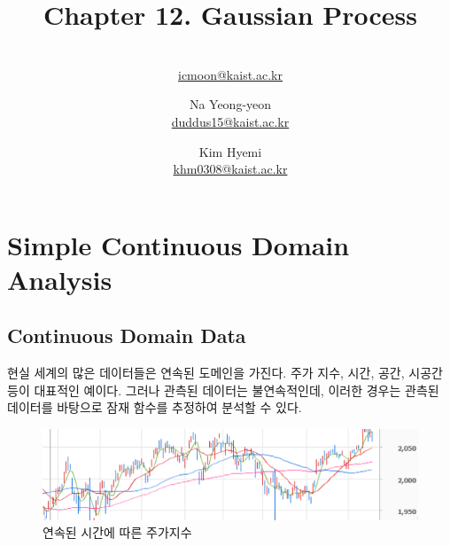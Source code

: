 \documentclass[a4paper]{oblivoir}
\title{Chapter 12. Gaussian Process}
\author{\makebox[.9\textwidth]{Moon Il-chul}\\ \href{mailto:icmoon@kaist.ac.kr}{icmoon@kaist.ac.kr}
\and Na Yeong-yeon\\ \href{mailto:duddus15@kaist.ac.kr}{duddus15@kaist.ac.kr}
\and Kim Hyemi\\ \href{mailto:khm0308@kaist.ac.kr}{khm0308@kaist.ac.kr}}
\begin{document}
\maketitle

\tableofcontents
\newpage

\section{Simple Continuous Domain Analysis}

\subsection{Continuous Domain Data}

현실 세계의 많은 데이터들은 연속된 도메인을 가진다. 주가 지수, 시간, 공간, 시공간 등이 대표적인 예이다. 그러나 관측된 데이터는 불연속적인데, 이러한 경우는 관측된 데이터를 바탕으로 잠재 함수를 추정하여 분석할 수 있다.\\

\begin{figure}[ht] \centering 
\includegraphics[scale=0.6]{fig12_1.png} 
\caption{연속된 시간에 따른 주가지수}
\label{fig:12-1}
\end{figure} 
\end{document}
